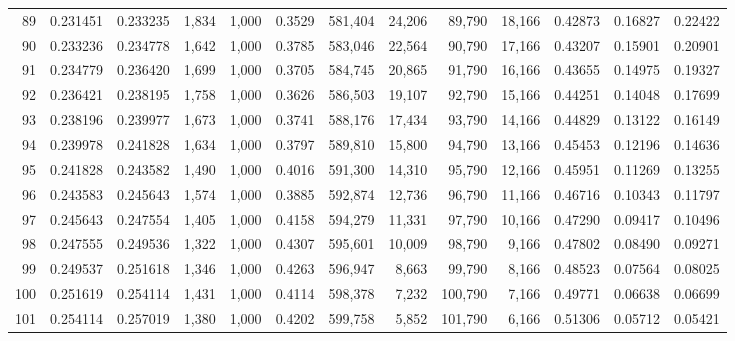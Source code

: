 \begin{tabular}{rrrrrrrrrrrrr}
89  &  0.231451 &  0.233235 &   1,834 &  1,000 &                                     0.3529 &  581,404 &   24,206 &   89,790 &   18,166 &  0.42873 &  0.16827 &  0.22422 \\
90  &  0.233236 &  0.234778 &   1,642 &  1,000 &                                     0.3785 &  583,046 &   22,564 &   90,790 &   17,166 &  0.43207 &  0.15901 &  0.20901 \\
91  &  0.234779 &  0.236420 &   1,699 &  1,000 &                                     0.3705 &  584,745 &   20,865 &   91,790 &   16,166 &  0.43655 &  0.14975 &  0.19327 \\
92  &  0.236421 &  0.238195 &   1,758 &  1,000 &                                     0.3626 &  586,503 &   19,107 &   92,790 &   15,166 &  0.44251 &  0.14048 &  0.17699 \\
93  &  0.238196 &  0.239977 &   1,673 &  1,000 &                                     0.3741 &  588,176 &   17,434 &   93,790 &   14,166 &  0.44829 &  0.13122 &  0.16149 \\
94  &  0.239978 &  0.241828 &   1,634 &  1,000 &                                     0.3797 &  589,810 &   15,800 &   94,790 &   13,166 &  0.45453 &  0.12196 &  0.14636 \\
95  &  0.241828 &  0.243582 &   1,490 &  1,000 &                                     0.4016 &  591,300 &   14,310 &   95,790 &   12,166 &  0.45951 &  0.11269 &  0.13255 \\
96  &  0.243583 &  0.245643 &   1,574 &  1,000 &                                     0.3885 &  592,874 &   12,736 &   96,790 &   11,166 &  0.46716 &  0.10343 &  0.11797 \\
97  &  0.245643 &  0.247554 &   1,405 &  1,000 &                                     0.4158 &  594,279 &   11,331 &   97,790 &   10,166 &  0.47290 &  0.09417 &  0.10496 \\
98  &  0.247555 &  0.249536 &   1,322 &  1,000 &                                     0.4307 &  595,601 &   10,009 &   98,790 &    9,166 &  0.47802 &  0.08490 &  0.09271 \\
99  &  0.249537 &  0.251618 &   1,346 &  1,000 &                                     0.4263 &  596,947 &    8,663 &   99,790 &    8,166 &  0.48523 &  0.07564 &  0.08025 \\
100 &  0.251619 &  0.254114 &   1,431 &  1,000 &                                     0.4114 &  598,378 &    7,232 &  100,790 &    7,166 &  0.49771 &  0.06638 &  0.06699 \\
101 &  0.254114 &  0.257019 &   1,380 &  1,000 &                                     0.4202 &  599,758 &    5,852 &  101,790 &    6,166 &  0.51306 &  0.05712 &  0.05421 \\

\end{tabular}
